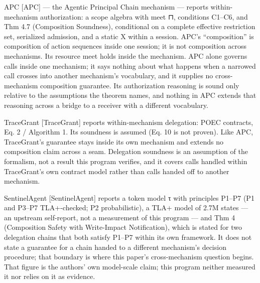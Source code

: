 \documentclass[
  10pt,
]{article}
\renewcommand{\_}{\origunderscore\allowbreak}
\begin{document}
APC {[}APC{]} --- the Agentic Principal Chain mechanism --- reports
within-mechanism authorization: a scope algebra with meet ⊓, conditions
C1--C6, and Thm 4.7 (Composition Soundness), conditional on a complete
effective restriction set, serialized admission, and a static X within a
session. APC's ``composition'' is composition of action sequences inside
one session; it is not composition across mechanisms. Its resource meet
holds inside the mechanism. APC alone governs calls inside one
mechanism; it says nothing about what happens when a narrowed call
crosses into another mechanism's vocabulary, and it supplies no
cross-mechanism composition guarantee. Its authorization reasoning is
sound only relative to the assumptions the theorem names, and nothing in
APC extends that reasoning across a bridge to a receiver with a
different vocabulary.

TraceGrant {[}TraceGrant{]} reports within-mechanism delegation: POEC
contracts, Eq. 2 / Algorithm 1. Its soundness is assumed (Eq. 10 is not
proven). Like APC, TraceGrant's guarantee stays inside its own mechanism
and extends no composition claim across a seam. Delegation soundness is
an assumption of the formalism, not a result this program verifies, and
it covers calls handled within TraceGrant's own contract model rather
than calls handed off to another mechanism.

SentinelAgent {[}SentinelAgent{]} reports a token model τ with
principles P1--P7 (P1 and P3--P7 TLA+-checked; P2 probabilistic), a TLA+
model of 2.7M states --- an upstream self-report, not a measurement of
this program --- and Thm 4 (Composition Safety with Write-Impact
Notification), which is stated for two delegation chains that both
satisfy P1--P7 within its own framework. It does not state a guarantee
for a chain handed to a different mechanism's decision procedure; that
boundary is where this paper's cross-mechanism question begins. That
figure is the authors' own model-scale claim; this program neither
measured it nor relies on it as evidence.
\end{document}
